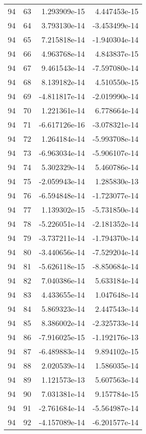 \begin{tabular}{rrrr}
  94 &   63 &  1.293909e-15 &  4.447453e-15 \\
  94 &   64 &  3.793130e-14 & -3.453499e-14 \\
  94 &   65 &  7.215818e-14 & -1.940304e-14 \\
  94 &   66 &  4.963768e-14 &  4.843837e-15 \\
  94 &   67 &  9.461543e-14 & -7.597080e-14 \\
  94 &   68 &  8.139182e-14 &  4.510550e-15 \\
  94 &   69 & -4.811817e-14 & -2.019990e-14 \\
  94 &   70 &  1.221361e-14 &  6.778664e-14 \\
  94 &   71 & -6.617126e-16 & -3.078321e-14 \\
  94 &   72 &  1.264184e-14 & -5.993708e-14 \\
  94 &   73 & -6.963034e-14 & -5.906107e-14 \\
  94 &   74 &  5.302329e-14 &  5.460786e-14 \\
  94 &   75 & -2.059943e-14 &  1.285830e-13 \\
  94 &   76 & -6.594848e-14 & -1.723077e-14 \\
  94 &   77 &  1.139302e-15 & -5.731850e-14 \\
  94 &   78 & -5.226051e-14 & -2.181352e-14 \\
  94 &   79 & -3.737211e-14 & -1.794370e-14 \\
  94 &   80 & -3.440656e-14 & -7.529204e-14 \\
  94 &   81 & -5.626118e-15 & -8.850684e-14 \\
  94 &   82 &  7.040386e-14 &  5.633184e-14 \\
  94 &   83 &  4.433655e-14 &  1.047648e-14 \\
  94 &   84 &  5.869323e-14 &  2.447543e-14 \\
  94 &   85 &  8.386002e-14 & -2.325733e-14 \\
  94 &   86 & -7.916025e-15 & -1.192176e-13 \\
  94 &   87 & -6.489883e-14 &  9.894102e-15 \\
  94 &   88 &  2.020539e-14 &  1.586035e-14 \\
  94 &   89 &  1.121573e-13 &  5.607563e-14 \\
  94 &   90 &  7.031381e-14 &  9.157784e-15 \\
  94 &   91 & -2.761684e-14 & -5.564987e-14 \\
  94 &   92 & -4.157089e-14 & -6.201577e-14 \\

\end{tabular}
